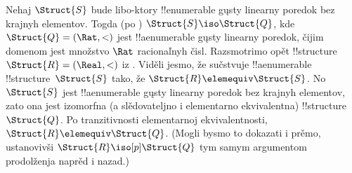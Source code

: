 \documentclass[../../../include/open-logic-section]{subfiles}
\begin{document}
\begin{rem}
  Nehaj $\Struct{S}$ bude libo-ktory !!{enumerable} gųsty linearny
  poredok bez krajnyh elementov. Togda (po )
  $\Struct{S} \iso \Struct{Q}$, kde $\Struct{Q} = (\Rat, <)$ jest
  !!a{enumerable} gųsty linearny poredok, čijim domenom jest množstvo
  $\Rat$ racionaľnyh čisl. Razsmotrimo opět
  !!{structure}~$\Struct{R} = (\Real, <)$ iz .
  Viděli jesmo, že sučstvuje !!a{enumerable} !!{structure}~$\Struct{S}$
  tako, že $\Struct{R} \elemequiv \Struct{S}$. No $\Struct{S}$ jest
  !!a{enumerable} gųsty linearny poredok bez krajnyh elementov, zato
  ona jest izomorfna (a slědovateljno i elementarno ekvivalentna)
  !!{structure}~$\Struct{Q}$. Po tranzitivnosti elementarnoj
  ekvivalentnosti, $\Struct{R} \elemequiv \Struct{Q}$. (Mogli bysmo to
  dokazati i prěmo, ustanovivši $\Struct{R} \iso[p] \Struct{Q}$ tym
  samym argumentom prodolženja naprěd i nazad.)
\end{rem}
\end{document}
